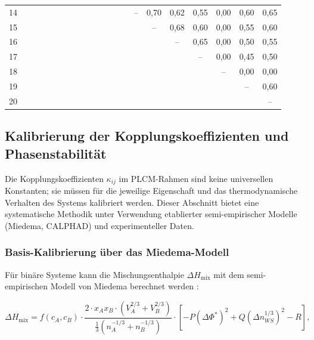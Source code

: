 \documentclass[12pt,a4paper]{article}
\begin{document}
{\begin{longtable}{c|*{20}{c}}
		14 &   &   &   &   &   &   &   &   &   &   &   &   &   & – & 0,70 & 0,62 & 0,55 & 0,00 & 0,60 & 0,65 \\
		15 &   &   &   &   &   &   &   &   &   &   &   &   &   &   & – & 0,68 & 0,60 & 0,00 & 0,55 & 0,60 \\
		16 &   &   &   &   &   &   &   &   &   &   &   &   &   &   &   & – & 0,65 & 0,00 & 0,50 & 0,55 \\
		17 &   &   &   &   &   &   &   &   &   &   &   &   &   &   &   &   & – & 0,00 & 0,45 & 0,50 \\
		18 &   &   &   &   &   &   &   &   &   &   &   &   &   &   &   &   &   & – & 0,00 & 0,00 \\
		19 &   &   &   &   &   &   &   &   &   &   &   &   &   &   &   &   &   &   & – & 0,60 \\
		20 &   &   &   &   &   &   &   &   &   &   &   &   &   &   &   &   &   &   &   & – \\
		\bottomrule
\end{longtable}}

\subsection{Kalibrierung der Kopplungskoeffizienten und Phasenstabilität}
\label{subsec:calibration}

Die Kopplungskoeffizienten \(\kappa_{ij}\) im PLCM-Rahmen sind keine universellen Konstanten; sie müssen für die jeweilige Eigenschaft und das thermodynamische Verhalten des Systems kalibriert werden. Dieser Abschnitt bietet eine systematische Methodik unter Verwendung etablierter semi-empirischer Modelle (Miedema, CALPHAD) und experimenteller Daten.

\subsubsection{Basis-Kalibrierung über das Miedema-Modell}

Für binäre Systeme kann die Mischungsenthalpie \(\Delta H_{\text{mix}}\) mit dem semi-empirischen Modell von Miedema berechnet werden \cite{Miedema1980, Takeuchi2010}:

\begin{equation}
	\Delta H_{\text{mix}} = f(c_A, c_B) \cdot \frac{2 \cdot x_A x_B \cdot (V_A^{2/3} + V_B^{2/3})}{\frac{1}{3}(n_A^{-1/3} + n_B^{-1/3})}
	\cdot \left[ -P (\Delta \Phi^*)^2 + Q (\Delta n_{WS}^{1/3})^2 - R \right],
	\label{eq:miedema}
\end{equation}
\end{document}
